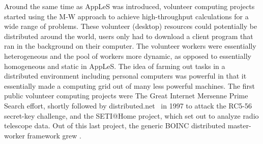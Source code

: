 \documentclass{sig-alternate}
\begin{document}





Around the same time as AppLeS was introduced, volunteer computing projects
started using the M-W approach to achieve high-throughput calculations for a
wide range of problems.
These volunteer (desktop) resources could potentially be distributed around the
world, users only had to download a client program that ran in the background
on their computer. The volunteer workers were essentially heterogeneous and the
pool of workers more dynamic, as opposed to essentially homogeneous and static
in AppLeS. The idea of farming out tasks in a distributed environment including
personal computers was powerful in that it essentially made a computing grid
out of many less powerful machines. The first public volunteer computing
projects were The Great Internet Mersenne Prime Search
effort\cite{woltman:2004:gimps}, shortly followed by
distributed.net~\cite{Lawton:2000:distributednet} in 1997 to attack the RC5-56
secret-key challenge, and the SETI@Home project, which set out to analyze radio
telescope data. Out of this last project, the generic BOINC distributed
master-worker framework grew \cite{Anderson:2004:BSP:1032646.1033223}.%
\end{document}
